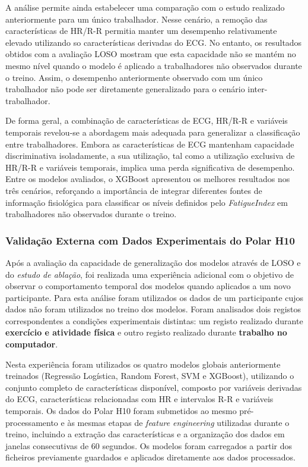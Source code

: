 A análise permite ainda estabelecer uma comparação com o estudo realizado anteriormente para um único trabalhador. Nesse cenário, a remoção das características de HR/R-R permitia manter um desempenho relativamente elevado utilizando so características derivadas do ECG. No entanto, os resultados obtidos com a avaliação LOSO mostram que esta capacidade não se mantém no mesmo nível quando o modelo é aplicado a trabalhadores não observados durante o treino. Assim, o desempenho anteriormente observado com um único trabalhador não pode ser diretamente generalizado para o cenário inter-trabalhador.

De forma geral, a combinação de características de ECG, HR/R-R e variáveis temporais revelou-se a abordagem mais adequada para generalizar a classificação entre trabalhadores. Embora as características de ECG mantenham capacidade discriminativa isoladamente, a sua utilização, tal como a utilização exclusiva de HR/R-R e variáveis temporais, implica uma perda significativa de desempenho. Entre os modelos avaliados, o XGBoost apresentou os melhores resultados nos três cenários, reforçando a importância de integrar diferentes fontes de informação fisiológica para classificar os níveis definidos pelo \textit{FatigueIndex} em trabalhadores não observados durante o treino.

\subsubsection*{Validação Externa com Dados Experimentais do Polar H10}

Após a avaliação da capacidade de generalização dos modelos através de LOSO e do \textit{estudo de ablação}, foi realizada uma experiência adicional com o objetivo de observar o comportamento temporal dos modelos quando aplicados a um novo participante. Para esta análise foram utilizados os dados de um participante cujos dados não foram utilizados no treino dos modelos. Foram analisados dois registos correspondentes a condições experimentais distintas: um registo realizado durante \textbf{exercício e atividade física} e outro registo realizado durante \textbf{trabalho no computador}.

Nesta experiência foram utilizados os quatro modelos globais anteriormente treinados (Regressão Logística, Random Forest, SVM e XGBoost), utilizando o conjunto completo de características disponível, composto por variáveis derivadas do ECG, características relacionadas com HR e intervalos R-R e variáveis temporais. Os dados do Polar H10 foram submetidos ao mesmo pré-processamento e às mesmas etapas de \textit{feature engineering} utilizadas durante o treino, incluindo a extração das características e a organização dos dados em janelas consecutivas de 60 segundos. Os modelos foram carregados a partir dos ficheiros previamente guardados e aplicados diretamente aos dados processados.

